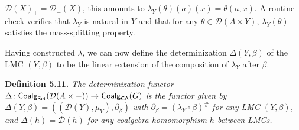 \hypertarget{html:S5.SS0.SSS0.Px2.p2.m6}{}\({{\mathcal{D}}(X)_{\bot}={\mathcal{D}}_{\bot}(X)}\), this amounts to %
\hypertarget{html:S5.SS0.SSS0.Px2.p2.m7}{}\({\lambda_{Y}(\theta)(a)(x)=\theta(a,x)}\). A routine check verifies that %
\hypertarget{html:S5.SS0.SSS0.Px2.p2.m8}{}\({\lambda_{Y}}\) is natural in %
\hypertarget{html:S5.SS0.SSS0.Px2.p2.m9}{}\({Y}\) and that for any %
\hypertarget{html:S5.SS0.SSS0.Px2.p2.m10}{}\({\theta\in{\mathcal{D}}(A\times Y)}\), %
\hypertarget{html:S5.SS0.SSS0.Px2.p2.m11}{}\({\lambda_{Y}(\theta)}\) satisfies the mass-splitting property.
\par\medskip
\hypertarget{html:S5.SS0.SSS0.Px2.p3}{} Having constructed %
\hypertarget{html:S5.SS0.SSS0.Px2.p3.m1}{}\({\lambda}\), we can now define the determinization %
\hypertarget{html:S5.SS0.SSS0.Px2.p3.m2}{}\({\Delta(Y,\beta)}\) of the LMC %
\hypertarget{html:S5.SS0.SSS0.Px2.p3.m3}{}\({(Y,\beta)}\) to be the linear extension of the composition of %
\hypertarget{html:S5.SS0.SSS0.Px2.p3.m4}{}\({\lambda_{Y}}\) after %
\hypertarget{html:S5.SS0.SSS0.Px2.p3.m5}{}\({\beta}\).
\par\medskip
\hypertarget{html:S5.Thmtheorem11}{} \par\noindent\textbf{\textbf{Definition 5.11}\textbf{.}}\quad  %
\hypertarget{html:S5.Thmtheorem11.p1}{} \emph{The \emph{determinization functor} %
\hypertarget{html:S5.Thmtheorem11.p1.m1}{}\({\Delta\colon\mbox{\sf Coalg}_{\mathsf{Set}}({\mathcal{D}}(A\times-))\to\mbox{\sf Coalg}_{\mathsf{CA}}(G)}\) is the functor given by %
\hypertarget{html:S5.Thmtheorem11.p1.m2}{}\({\Delta(Y,\beta)=(({\mathcal{D}}(Y),\mu_{Y}),\partial_{\beta})}\) with %
\hypertarget{html:S5.Thmtheorem11.p1.m3}{}\({\partial_{\beta}=(\lambda_{Y}\circ\beta)^{\#}}\) for any LMC %
\hypertarget{html:S5.Thmtheorem11.p1.m4}{}\({(Y,\beta)}\), and %
\hypertarget{html:S5.Thmtheorem11.p1.m5}{}\({\Delta(h)={\mathcal{D}}(h)}\) for any coalgebra homomorphism %
\hypertarget{html:S5.Thmtheorem11.p1.m6}{}\({h}\) between LMCs.}
